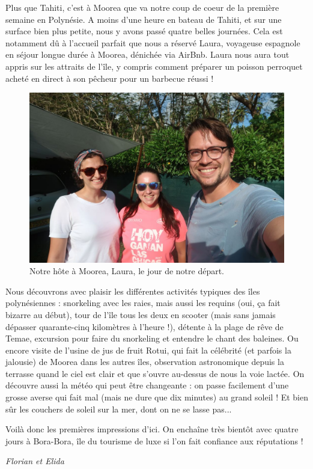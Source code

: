Plus que Tahiti, c'est à Moorea que va notre coup de coeur de la
première semaine en Polynésie. A moins d'une heure en bateau de Tahiti,
et sur une surface bien plus petite, nous y avons passé quatre belles
journées. Cela est notamment dû à l'accueil parfait que nous a réservé
Laura, voyageuse espagnole en séjour longue durée à Moorea, dénichée via
AirBnb. Laura nous aura tout appris sur les attraits de l'île, y compris
comment préparer un poisson perroquet acheté en direct à son pêcheur
pour un barbecue réussi !

\begin{figure}
\centering
\includegraphics{images/20180810_moorea_laura.JPG}
\caption{Notre hôte à Moorea, Laura, le jour de notre départ.}
\end{figure}

Nous découvrons avec plaisir les différentes activités typiques des îles
polynésiennes : snorkeling avec les raies, mais aussi les requins (oui,
ça fait bizarre au début), tour de l'île tous les deux en scooter (mais
sans jamais dépasser quarante-cinq kilomètres à l'heure !), détente à la
plage de rêve de Temae, excursion pour faire du snorkeling et entendre
le chant des baleines. Ou encore visite de l'usine de jus de fruit
Rotui, qui fait la célébrité (et parfois la jalousie) de Moorea dans les
autres îles, observation astronomique depuis la terrasse quand le ciel
est clair et que s'ouvre au-dessus de nous la voie lactée. On découvre
aussi la météo qui peut être changeante : on passe facilement d'une
grosse averse qui fait mal (mais ne dure que dix minutes) au grand
soleil ! Et bien sûr les couchers de soleil sur la mer, dont on ne se
lasse pas...

Voilà donc les premières impressions d'ici. On enchaîne très bientôt
avec quatre jours à Bora-Bora, île du tourisme de luxe si l'on fait
confiance aux réputations !

\emph{Florian et Elida}
